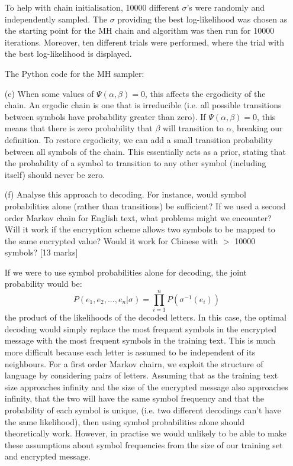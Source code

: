 \documentclass[12pt]{article}
\begin{document}
\begin{enumerate}
To help with chain initialisation, 10000 different $\sigma$'s were randomly and independently sampled. The $\sigma$ providing the best log-likelihood was chosen as the starting point for the MH chain and algorithm was then run for 10000 iterations. Moreover, ten different trials were performed, where the trial with the best log-likelihood is displayed.

\newpage

The Python code for the MH sampler:

\newpage



\newpage

\item[(e)] When some values of $\Psi(\alpha, \beta) = 0$, this affects the ergodicity of the chain. An ergodic chain is one that is irreducible (i.e. all possible transitions between symbols have probability greater than zero). If $\Psi(\alpha, \beta) = 0$, this means that there is zero probability that $\beta$ will transition to $\alpha$, breaking our definition. To restore ergodicity, we can add a small transition probability between all symbols of the chain. This essentially acts as a prior, stating that the probability of a symbol to transition to any other symbol (including itself) should never be zero.


\item[(f)] Analyse this approach to decoding. For instance, would symbol probabilities alone (rather than transitions) be sufficient? If we used a second order Markov chain for English text, what problems might we encounter? Will it work if the encryption scheme allows two symbols to be mapped to the same encrypted value? Would it work for Chinese with $>$ 10000 symbols? [13 marks]

If we were to use symbol probabilities alone for decoding, the joint probability would be:
$$P(e_1, e_2,...,e_n|\sigma) = \prod_{i=1}^n P(\sigma^{-1}(e_i))$$
the product of the likelihoods of the decoded letters. In this case, the optimal decoding would simply replace the most frequent symbols in the encrypted message with the most frequent symbols in the training text. This is much more difficult because each letter is assumed to be independent of its neighbours. For a first order Markov chairn, we exploit the structure of language by considering pairs of letters. Assuming that as the training text size approaches infinity and the size of the encrypted message also approaches infinity, that the two will have the same symbol frequency and that the probability of each symbol is unique, (i.e. two different decodings can't have the same likelihood), then using symbol probabilities alone should theoretically work. However, in practise we would unlikely to be able to make these assumptions about symbol frequencies from the size of our training set and encrypted message.


\end{enumerate}
\end{document}
